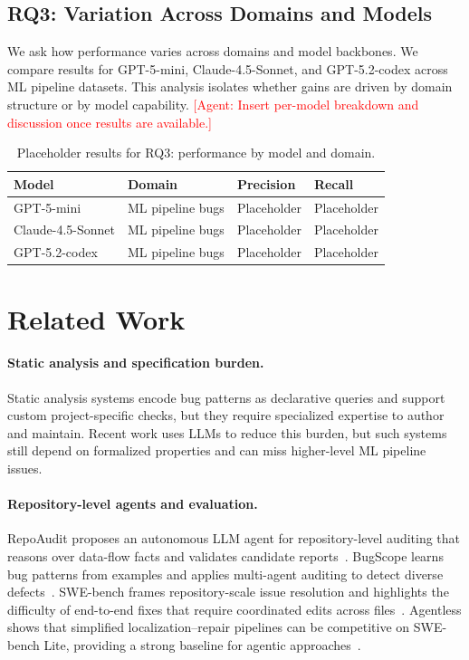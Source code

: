 \documentclass[11pt]{article}
\newcommand{\agent}[1]{\textcolor{red}{[Agent: #1]}}
\begin{document}
\subsection{RQ3: Variation Across Domains and Models}
We ask how performance varies across domains and model backbones.
We compare results for GPT-5-mini, Claude-4.5-Sonnet, and GPT-5.2-codex across ML pipeline datasets.
This analysis isolates whether gains are driven by domain structure or by model capability.
\agent{Insert per-model breakdown and discussion once results are available.}

\begin{table}[t]
  \centering
  \caption{Placeholder results for RQ3: performance by model and domain.}
  \label{tab:rq3}
  \begin{tabular}{llll}
    \toprule
    Model & Domain & Precision & Recall \\
    \midrule
    GPT-5-mini & ML pipeline bugs & Placeholder & Placeholder \\
    Claude-4.5-Sonnet & ML pipeline bugs & Placeholder & Placeholder \\
    GPT-5.2-codex & ML pipeline bugs & Placeholder & Placeholder \\
    \bottomrule
  \end{tabular}
\end{table}

\section{Related Work}

\paragraph{Static analysis and specification burden.}
Static analysis systems encode bug patterns as declarative queries and support custom project-specific checks, but they require specialized expertise to author and maintain.
Recent work uses LLMs to reduce this burden, but such systems still depend on formalized properties and can miss higher-level ML pipeline issues.

\paragraph{Repository-level agents and evaluation.}
RepoAudit proposes an autonomous LLM agent for repository-level auditing that reasons over data-flow facts and validates candidate reports~\citep{guo2025repoaudit}.
BugScope learns bug patterns from examples and applies multi-agent auditing to detect diverse defects~\citep{guo2025bugscope}.
SWE-bench frames repository-scale issue resolution and highlights the difficulty of end-to-end fixes that require coordinated edits across files~\citep{jimenez2024swebench}.
Agentless shows that simplified localization--repair pipelines can be competitive on SWE-bench Lite, providing a strong baseline for agentic approaches~\citep{xia2024agentless}.
\end{document}
